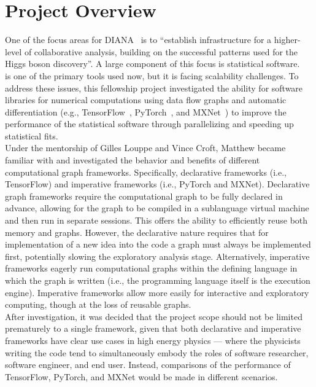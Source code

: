 \section{Project Overview}

One of the focus areas for DIANA~\cite{DIANA-proposal-2014} is to ``establish infrastructure for a higher-level of collaborative analysis, building on the successful patterns used for the Higgs boson discovery''.
A large component of this focus is statistical software.
~\cite{Verkerke:2003ir} is one of the primary tools used now, but it is facing scalability challenges.
To address these issues, this fellowship project investigated the ability for software libraries for numerical computations using data flow graphs and automatic differentiation (e.g., TensorFlow~\cite{tensorflow2015-whitepaper}, PyTorch~\cite{paszke2017automatic}, and MXNet~\cite{DBLP:journals/corr/ChenLLLWWXXZZ15}) to improve the performance of the statistical software through parallelizing and speeding up statistical fits.\\

Under the mentorship of Gilles Louppe and Vince Croft, Matthew became familiar with and investigated the behavior and benefits of different computational graph frameworks.
Specifically, declarative frameworks (i.e., TensorFlow) and imperative frameworks (i.e., PyTorch and MXNet).
Declarative graph frameworks require the computational graph to be fully declared in advance, allowing for the graph to be compiled in a sublanguage virtual machine and then run in separate sessions.
This offers the ability to efficiently reuse both memory and graphs.
However, the declarative nature requires that for implementation of a new idea into the code a graph must always be implemented first, potentially slowing the exploratory analysis stage.
Alternatively, imperative frameworks eagerly run computational graphs within the defining language in which the graph is written (i.e., the programming language itself is the execution engine).
Imperative frameworks allow more easily for interactive and exploratory computing, though at the loss of reusable graphs.~\cite{Chintala:2302087}\\

After investigation, it was decided that the project scope should not be limited prematurely to a single framework, given that both declarative and imperative frameworks have clear use cases in high energy physics --- where the physicists writing the code tend to simultaneously embody the roles of software researcher, software engineer, and end user.
Instead, comparisons of the performance of TensorFlow, PyTorch, and MXNet would be made in different scenarios.\\

